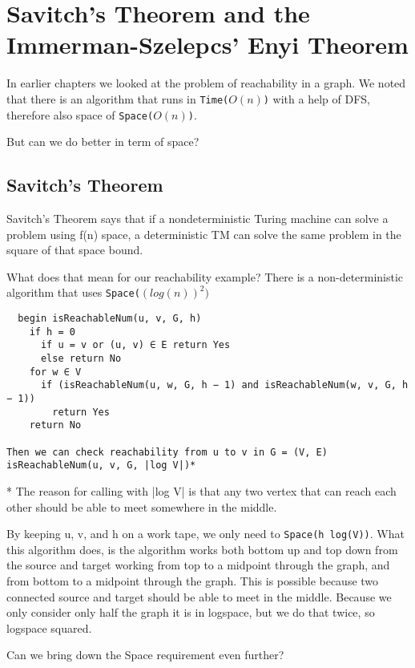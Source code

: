 \section{Savitch's Theorem and the Immerman-Szelepcs' Enyi Theorem}

In earlier chapters we looked at the problem of reachability in a graph.
We noted that there is an algorithm that runs in \texttt{Time($O({n})$)} with a help of DFS, 
therefore also space of \texttt{Space($O({n})$)}.


But can we do better in term of space? 
\subsection{Savitch’s Theorem}
Savitch’s Theorem says that if a nondeterministic Turing machine can solve a problem using f(n) space,
a deterministic TM can solve the same problem in the square of that space bound. 

What does that mean for our reachability example?
There is a non-deterministic algorithm that uses \texttt{Space($(log(n))^2)$}

\begin{verbatim}
  begin isReachableNum(u, v, G, h)
    if h = 0
      if u = v or (u, v) ∈ E return Yes
      else return No 
    for w ∈ V
      if (isReachableNum(u, w, G, h − 1) and isReachableNum(w, v, G, h − 1)) 
        return Yes
    return No

Then we can check reachability from u to v in G = (V, E)
isReachableNum(u, v, G, |log V|)*
\end{verbatim}
* The reason for calling with |log V| is that any two vertex that can reach each other should be able to meet somewhere in the middle.

By keeping u, v, and h on a work tape, we only need to \texttt{Space(h log(V))}. 
What this algorithm does, is the algorithm works both bottom up and top down from the source and target 
working from top to a midpoint through the graph, and from bottom to a midpoint through the graph. 
This is possible because two connected source and target should be able to meet in the middle.
Because we only consider only half the graph it is in logspace, but we do that twice, so logspace squared.


Can we bring down the Space requirement even further?

